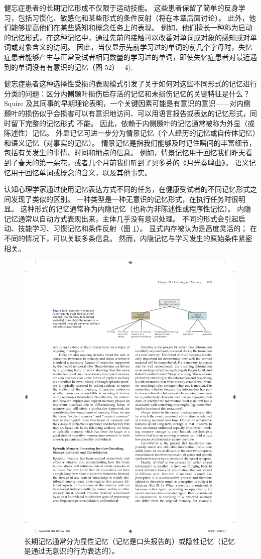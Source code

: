 健忘症患者的长期记忆形成不仅限于运动技能。 这些患者保留了简单的反身学习，包括习惯化、敏感化和某些形式的条件反射（将在本章后面讨论）。 此外，他们能够提高他们在某些感知和概念任务上的表现。 例如，他们擅长一种称为启动的记忆形式，在这种记忆中，通过先前的接触可以改善对单词或对象的感知或对单词或对象含义的访问。 因此，当仅显示先前学习过的单词的前几个字母时，失忆症患者能够产生与正常受试者相同数量的学习过的单词，即使失忆症患者对最近遇到的单词没有有意识的记忆（图 52） –4).

健忘症患者这种选择性受损的表现模式引发了关于如何对这些不同形式的记忆进行分类的问题：区分内侧颞叶损伤后存活的记忆和未损伤记忆的关键特征是什么？ Squire 及其同事的早期理论表明，一个关键因素可能是有意识的意识——对内侧颞叶的损伤似乎会损害可以有意识地访问、可以用语言报告或表达的记忆形式，同时留下完整的记忆形式 不能。 因此，依赖于内侧颞叶的记忆通常被称为外显（或陈述性）记忆。 外显记忆可进一步分为情景记忆（个人经历的记忆或自传体记忆）和语义记忆（对事实的记忆）。 情景记忆是指我们能够及时记住瞬间的丰富细节，包括有关发生的事情、时间和地点的信息。 例如，情景记忆用于回忆我们昨天看到了春天的第一朵花，或者几个月前我们听到了贝多芬的《月光奏鸣曲》。 语义记忆用于回忆单词或概念的含义，以及其他事实。

认知心理学家通过使用记忆表达方式不同的任务，在健康受试者的不同记忆形式之间发现了类似的区别。 一种类型是一种无意识的记忆形式，在执行任务时很明显。 这种形式的记忆通常称为内隐记忆（也称为非陈述性或程序性记忆）。 内隐记忆通常以自动方式表现出来，主体几乎没有意识处理。 不同的形式会引起启动、技能学习、习惯记忆和条件反射（图 \ref{fig:52_5}）。 显式内存被认为是高度灵活的； 在不同的情况下，可以关联多条信息。 然而，内隐记忆与学习发生的原始条件紧密相关。

\begin{figure}[htbp]
	\centering
	\includegraphics[width=0.7\linewidth]{chap52/fig_52_5}
	\caption{长期记忆通常分为显性记忆（记忆是口头报告的）或隐性记忆（记忆是通过无意识的行为表达的）。}
	\label{fig:52_5}
\end{figure}

